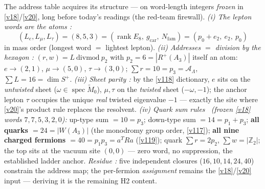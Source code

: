 \documentclass[11pt,a4paper]{article}
\newcommand{\Nfam}{N_{\mathrm{fam}}}
\newcommand{\gcar}{g_{\mathrm{car}}}
\newcommand{\Z}{\mathbb Z}
\begin{document}
\begin{keybox}
The address table acquires its structure --- on word-length integers \emph{frozen} in \vref{v18}/\vref{v20}, long
before today's readings (the red-team firewall). \emph{(i) The lepton words are the atoms \mE:}
\[
  \boxed{\ (L_e,L_\mu,L_\tau)=(8,5,3)=(\operatorname{rank}E_8,\ \gcar,\ \Nfam)=(p_0{+}e_2,\ e_2,\ p_0)\ }
\]
in mass order (longest word $=$ lightest lepton). \emph{(ii) Addresses $=$ division by the hexagon
\mE:} $(r,w)=L\ \mathrm{divmod}\ p_2$ with $p_2=6=|R^+(A_3)|$ itself an atom: $e\to(2,1)$,
$\mu\to(5,0)$, $\tau\to(3,0)$; $\sum r=10=p_3=\mathcal A_\Lambda$, $\sum L=16=\dim S^+$. \emph{(iii) Sheet parity
\mE:} by the \vref{v118} dictionary, $e$ sits on the \emph{untwisted} sheet ($\omega\in\operatorname{spec}
\widetilde M_0$), $\mu,\tau$ on the \emph{twisted} sheet ($-\omega,-1$); the anchor lepton $\tau$
occupies the unique \emph{real} twisted eigenvalue $-1$ --- exactly the site where \vref{v20}'s product rule
replaces the resolvent. \emph{(iv) Quark sum rules \mE\ (frozen \vref{v18} words $7,7,5,3,2,0$):} up-type sum
$=10=p_3$; down-type sum $=14=p_1{+}p_3$; \textbf{all quarks $=24=|W(A_3)|$} (the monodromy group
order, \vref{v117}); \textbf{all nine charged fermions $=40=p_1p_3=a^TRa$} (\vref{v119}); quark $\sum r=2p_2$,
$\sum w=|\Z_2|$; the top sits at the vacuum site $(0,0)$ --- zero word, no suppression, the
established ladder anchor. \emph{Residue \mC:} five independent closures ($16,10,14,24,40$) constrain
the address map; the per-fermion \emph{assignment} remains the \vref{v18}/\vref{v20} input --- deriving it is the
remaining H2 content.
\end{keybox}
\end{document}
